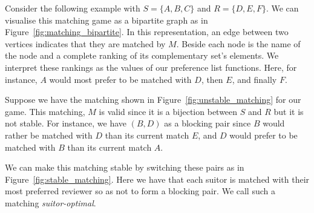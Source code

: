\begin{example}\label{example:matching}
    Consider the following example with \(S = \{A, B, C\}\) and \(R = \{D, E,
    F\}\). We can visualise this matching game as a bipartite graph as in
    Figure~\ref{fig:matching_bipartite}. In this representation, an edge between
    two vertices indicates that they are matched by \(M\). Beside each node is 
    the name of the node and a complete ranking of its complementary set's 
    elements. We interpret these rankings as the values of our preference list 
    functions. Here, for instance, \(A\) would most prefer to be matched with 
    \(D\), then \(E\), and finally \(F\).
    
    \begin{figure}[h]
        \centering
        
    \end{figure}

    Suppose we have the matching shown in Figure~\ref{fig:unstable_matching} for
    our game. This matching, \(M\) is valid since it is a bijection between 
    \(S\) and \(R\) but it is not stable. For instance, we have \((B, D)\) as a
    blocking pair since \(B\) would rather be matched with \(D\) than its 
    current match \(E\), and \(D\) would prefer to be matched with \(B\) than
    its current match \(A\).

    \begin{figure}[h]
        \centering
        
    \end{figure}

    We can make this matching stable by switching these pairs as in
    Figure~\ref{fig:stable_matching}. Here we have that each suitor is matched 
    with their most preferred reviewer so as not to form a blocking pair. We 
    call such a matching \emph{suitor-optimal}.

    \begin{figure}[h]
        \centering
        
    \end{figure}
\end{example}
